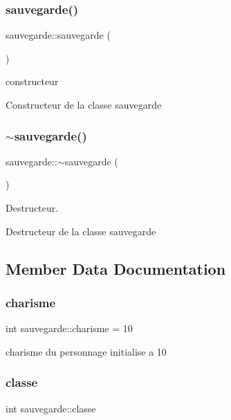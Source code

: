 \subsubsection{\texorpdfstring{sauvegarde()}{sauvegarde()}\hspace{0.1cm}{\footnotesize\ttfamily [2/2]}}
{\footnotesize\ttfamily sauvegarde\+::sauvegarde (\begin{DoxyParamCaption}{ }\end{DoxyParamCaption})}



constructeur 

Constructeur de la classe sauvegarde \mbox{\label{classsauvegarde_a4a83cdaed16faa198b7b8b16a9d16a01}} 
\subsubsection{\texorpdfstring{$\sim$sauvegarde()}{~sauvegarde()}}
{\footnotesize\ttfamily sauvegarde\+::$\sim$sauvegarde (\begin{DoxyParamCaption}{ }\end{DoxyParamCaption})}



Destructeur. 

Destructeur de la classe sauvegarde 

\subsection{Member Data Documentation}
\mbox{\label{classsauvegarde_a4e6c6ce21ae52120984f79144ddee95d}} 
\subsubsection{\texorpdfstring{charisme}{charisme}}
{\footnotesize\ttfamily int sauvegarde\+::charisme = 10}

charisme du personnage initialise a 10 \mbox{\label{classsauvegarde_aac8c952d4816b64287a25d945d3213c2}} 
\subsubsection{\texorpdfstring{classe}{classe}}
{\footnotesize\ttfamily int sauvegarde\+::classe}

